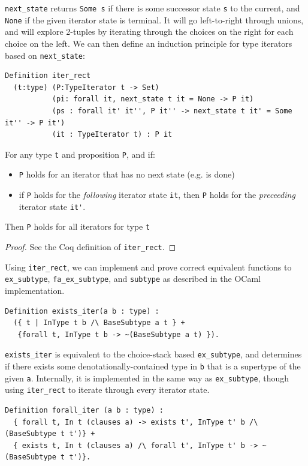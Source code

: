 \documentclass[a4paper,english]{lipics-v2018}
\begin{document}
\verb|next_state| returns \verb|Some s| if there is some successor state
\verb|s| to the current, and \verb|None| if the given iterator state is
terminal. It will go left-to-right through unions, and will explore 2-tuples
by iterating through the choices on the right for each choice on the left. We can
then define an induction principle for type iterators based on \verb|next_state|:

\begin{theorem}
\begin{verbatim}
Definition iter_rect
  (t:type) (P:TypeIterator t -> Set)
           (pi: forall it, next_state t it = None -> P it)
           (ps : forall it' it'', P it'' -> next_state t it' = Some it'' -> P it')
           (it : TypeIterator t) : P it  
\end{verbatim}

For any type \verb|t| and proposition \verb|P|, and if:
\begin{itemize} 
	\item \verb|P| holds for an iterator that has no next state (e.g. is done)
	\item if \verb|P| holds for the \emph{following} iterator state \verb|it|,
	then \verb|P| holds for the \emph{preceeding} iterator state \verb|it'|.
\end{itemize}
Then \verb|P| holds for all iterators for type \verb|t|
\end{theorem}
\begin{proof}
See the Coq definition of \verb|iter_rect|.
\end{proof}

Using \verb|iter_rect|, we can implement and prove correct equivalent functions
to \verb|ex_subtype|, \verb|fa_ex_subtype|, and \verb|subtype| as described in the
OCaml implementation.

\begin{verbatim}
Definition exists_iter(a b : type) : 
  ({ t | InType t b /\ BaseSubtype a t } +
   {forall t, InType t b -> ~(BaseSubtype a t) }).
\end{verbatim}

\verb|exists_iter| is equivalent to the choice-stack based \verb|ex_subtype|,
and determines if there exists some denotationally-contained type in \verb|b|
that is a supertype of the given \verb|a|. Internally, it is implemented in 
the same way as \verb|ex_subtype|, though using \verb|iter_rect| to iterate 
through every iterator state.

\begin{verbatim}
Definition forall_iter (a b : type) :
  { forall t, In t (clauses a) -> exists t', InType t' b /\ (BaseSubtype t t')} +
  { exists t, In t (clauses a) /\ forall t', InType t' b -> ~ (BaseSubtype t t')}.
\end{verbatim}
\end{document}
